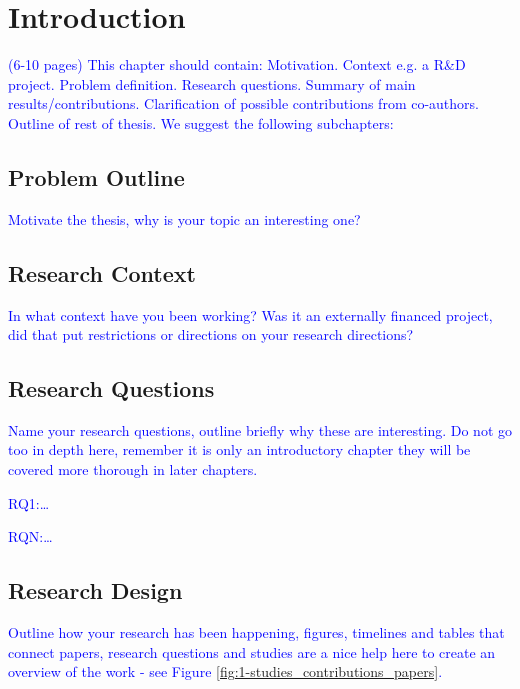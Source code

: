 \chapter{Introduction}

\textcolor{blue}{(6-10 pages) This chapter should contain: Motivation. Context e.g. a R\&D project. Problem definition. 
Research questions. Summary of main results/contributions. Clarification of possible contributions from co-authors. 
Outline of rest of thesis. We suggest the following subchapters:}

\section{Problem Outline}
\textcolor{blue}{Motivate the thesis, why is your topic an interesting one?}

\section{Research Context}
\textcolor{blue}{In what context have you been working? Was it an externally financed project, did that put restrictions or directions on your research directions?}

\section{Research Questions}
\textcolor{blue}{Name your research questions, outline briefly why these are interesting. Do not go too in depth here, remember it is only an introductory chapter they will be covered more thorough in later chapters.}

\textcolor{blue}{RQ1:\ldots}

\textcolor{blue}{RQN:\ldots}

\section{Research Design}
\textcolor{blue}{Outline how your research has been happening, figures, timelines and tables that connect papers, 
research questions and studies are a nice help here to create an overview of the work - see Figure
\ref{fig:1-studies_contributions_papers}.}


